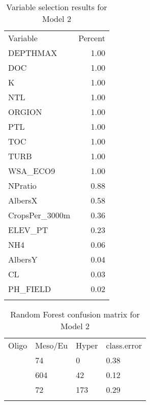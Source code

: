 \documentclass[11pt,]{article}
\begin{document}
\begin{longtable}[c]{@{}lr@{}}
\toprule\addlinespace
Variable & Percent
\\\addlinespace
\midrule\endhead
DEPTHMAX & 1.00
\\\addlinespace
DOC & 1.00
\\\addlinespace
K & 1.00
\\\addlinespace
NTL & 1.00
\\\addlinespace
ORGION & 1.00
\\\addlinespace
PTL & 1.00
\\\addlinespace
TOC & 1.00
\\\addlinespace
TURB & 1.00
\\\addlinespace
WSA\_ECO9 & 1.00
\\\addlinespace
NPratio & 0.88
\\\addlinespace
AlbersX & 0.58
\\\addlinespace
CropsPer\_3000m & 0.36
\\\addlinespace
ELEV\_PT & 0.23
\\\addlinespace
NH4 & 0.06
\\\addlinespace
AlbersY & 0.04
\\\addlinespace
CL & 0.03
\\\addlinespace
PH\_FIELD & 0.02
\\\addlinespace
\bottomrule
\addlinespace
\caption{Variable selection results for Model
2\label{tab:VarSel_Model2}}
\end{longtable}

\newpage

\begin{longtable}[c]{@{}llll@{}}
\toprule\addlinespace
Oligo & Meso/Eu & Hyper & class.error
\\\addlinespace
\midrule\endhead
122 & 74 & 0 & 0.38
\\\addlinespace
43 & 604 & 42 & 0.12
\\\addlinespace
0 & 72 & 173 & 0.29
\\\addlinespace
\bottomrule
\addlinespace
\caption{Random Forest confusion matrix for Model
2\label{tab:Confusion_Model2}}
\end{longtable}

\newpage
\end{document}
